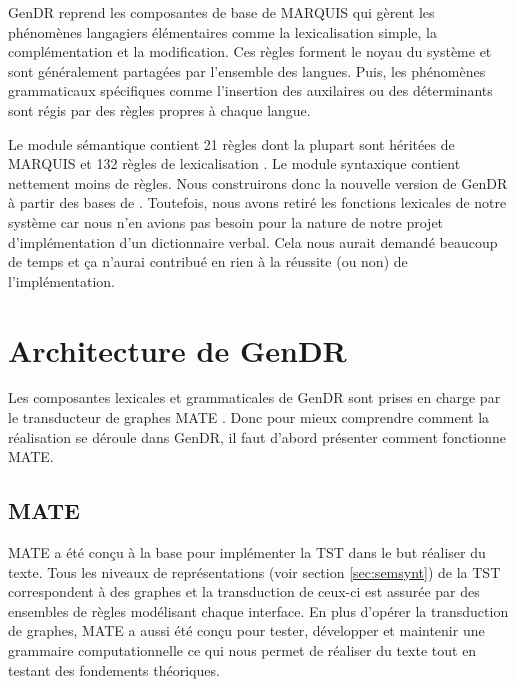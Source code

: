 GenDR reprend les composantes de base de MARQUIS qui gèrent les phénomènes langagiers élémentaires comme la  lexicalisation simple, la complémentation et la modification. Ces règles forment le noyau du système et sont généralement partagées par l'ensemble des langues. Puis, les phénomènes grammaticaux spécifiques comme l'insertion des auxilaires ou des déterminants sont régis par des règles propres à chaque langue.

Le module sémantique contient 21 règles dont la plupart sont héritées de MARQUIS et 132 règles de lexicalisation \citep{LambreyImplementationcollocationspour2017}. Le module syntaxique contient nettement moins de règles.  Nous construirons donc la nouvelle version de GenDR à partir des bases de \cite{LambreyImplementationcollocationspour2017, lareau18,dubinskaite17}. Toutefois, nous avons retiré les fonctions lexicales de notre système car nous n'en avions pas besoin pour la nature de notre projet d'implémentation d'un dictionnaire verbal. Cela nous aurait demandé beaucoup de temps et ça n'aurai contribué en rien à la réussite (ou non) de l'implémentation.

\section{Architecture de GenDR}

Les composantes lexicales et grammaticales de GenDR sont prises en charge par le transducteur de graphes MATE \citep{BohnetDevelopmentEnvironmentMTTbased2000,BOHNET10,bohnet07}. Donc pour mieux comprendre comment la réalisation se déroule dans GenDR, il faut d'abord présenter comment fonctionne MATE.

\subsection{MATE}
MATE a été conçu à la base pour implémenter la \ac{TST} dans le but réaliser du texte. Tous les niveaux de représentations (voir section \ref{sec:semsynt}) de la \ac{TST} correspondent à des graphes et la transduction de ceux-ci est assurée par des ensembles de règles modélisant chaque interface. En plus d'opérer la transduction de graphes, MATE a aussi été conçu pour tester, développer et maintenir une grammaire computationnelle ce qui nous permet de réaliser du texte tout en testant des fondements théoriques.

